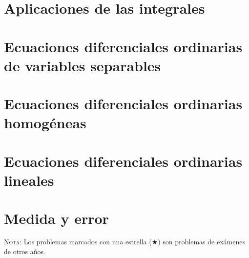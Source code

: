 \documentclass[a4paper,titlepage,dvips]{article}
\begin{document}
\section{Aplicaciones de las integrales}
\begin{enumerate}[leftmargin=*]
\end{enumerate}

\section{Ecuaciones diferenciales ordinarias de variables separables}
\begin{enumerate}[leftmargin=*]
\end{enumerate}

\section{Ecuaciones diferenciales ordinarias homogéneas}
\begin{enumerate}[leftmargin=*]
\end{enumerate}

\section{Ecuaciones diferenciales ordinarias lineales}
\begin{enumerate}[leftmargin=*]
\end{enumerate}

\section{Medida y error}
\begin{enumerate}[leftmargin=*]
\end{enumerate}

\vspace{2cm}

\textsc{Nota}: Los problemas marcados con una estrella ($\bigstar$) son problemas de
exámenes de otros años.
\end{document}
